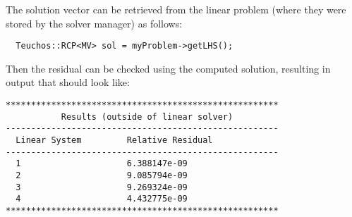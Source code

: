 The solution vector can be retrieved from the linear problem (where they were
stored by the solver manager) as follows:
\begin{verbatim}
  Teuchos::RCP<MV> sol = myProblem->getLHS();
\end{verbatim}
Then the residual can be checked using the computed solution, resulting in output
that should look like:
\begin{verbatim}
******************************************************
           Results (outside of linear solver)
------------------------------------------------------
  Linear System         Relative Residual
------------------------------------------------------
  1                     6.388147e-09
  2                     9.085794e-09
  3                     9.269324e-09
  4                     4.432775e-09
******************************************************
\end{verbatim}


